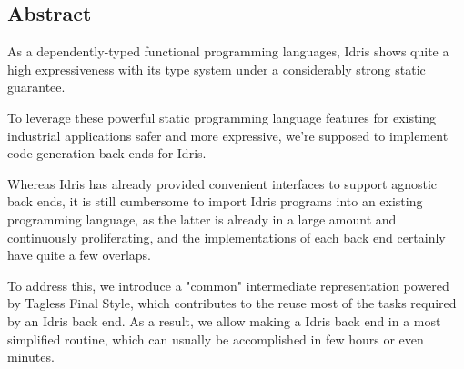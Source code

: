 \documentclass[a1,portrait]{a1poster}
\begin{document}
\begin{multicols}{2} %




\section*{Abstract}

As a dependently-typed functional programming languages, Idris shows
quite a high expressiveness with its type system under a considerably strong static guarantee.

To leverage these powerful static programming language features for
existing industrial applications safer and more expressive,
we're supposed to implement code generation back ends for Idris.

Whereas Idris has already provided convenient interfaces to support
agnostic back ends, it is still cumbersome to import Idris programs
into an existing programming language, as the latter is already
in a large amount and continuously proliferating, and the implementations
of each back end certainly have quite a few overlaps.
  
To address this, we introduce a "common" intermediate representation
powered by Tagless Final Style, which contributes to the reuse most of the tasks
required by an Idris back end. As a result, we allow making a Idris back end
in a most simplified routine, which can usually be accomplished in few hours
or even minutes.




\end{multicols}
\end{document}
